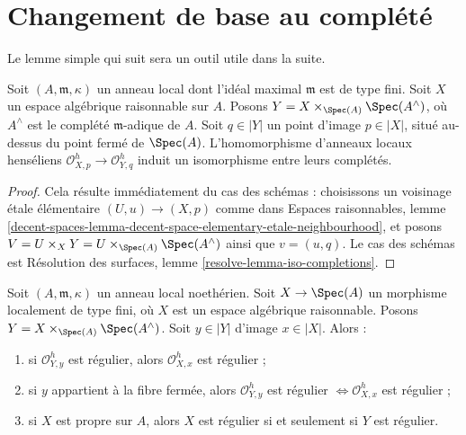 \section{Changement de base au complété}
\label{section-aux}

\noindent
Le lemme simple qui suit sera un outil utile dans la suite.

\begin{lemma}
\label{lemma-iso-completions}
Soit $(A, \mathfrak m, \kappa)$ un anneau local dont l'idéal maximal
$\mathfrak m$ est de type fini. Soit $X$ un espace algébrique raisonnable
sur $A$. Posons $Y = X \times_{\Spec(A)} \Spec(A^\wedge)$, où $A^\wedge$
est le complété $\mathfrak m$-adique de $A$.
Soit $q \in |Y|$ un point d'image $p \in |X|$, situé au-dessus du point fermé
de $\Spec(A)$. L'homomorphisme d'anneaux locaux henséliens
$\mathcal{O}_{X, p}^h \to \mathcal{O}_{Y, q}^h$ induit un isomorphisme entre
leurs complétés.
\end{lemma}

\begin{proof}
Cela résulte immédiatement du cas des schémas : choisissons un voisinage
étale élémentaire $(U, u) \to (X, p)$ comme dans Espaces raisonnables, lemme
\ref{decent-spaces-lemma-decent-space-elementary-etale-neighbourhood},
et posons $V = U \times_X Y = U \times_{\Spec(A)} \Spec(A^\wedge)$ ainsi que
$v = (u, q)$.
Le cas des schémas est Résolution des surfaces, lemme
\ref{resolve-lemma-iso-completions}.
\end{proof}

\begin{lemma}
\label{lemma-port-regularity-to-completion}
Soit $(A, \mathfrak m, \kappa)$ un anneau local noethérien.
Soit $X \to \Spec(A)$ un morphisme localement de type fini, où $X$ est un
espace algébrique raisonnable. Posons
$Y = X \times_{\Spec(A)} \Spec(A^\wedge)$. Soit $y \in |Y|$
d'image $x \in |X|$. Alors :
\begin{enumerate}
\item si $\mathcal{O}_{Y, y}^h$ est régulier, alors
$\mathcal{O}_{X, x}^h$ est régulier ;
\item si $y$ appartient à la fibre fermée, alors
$\mathcal{O}_{Y, y}^h$ est régulier
$\Leftrightarrow \mathcal{O}_{X, x}^h$ est régulier ;
\item si $X$ est propre sur $A$, alors $X$ est régulier si et seulement si
$Y$ est régulier.
\end{enumerate}
\end{lemma}

